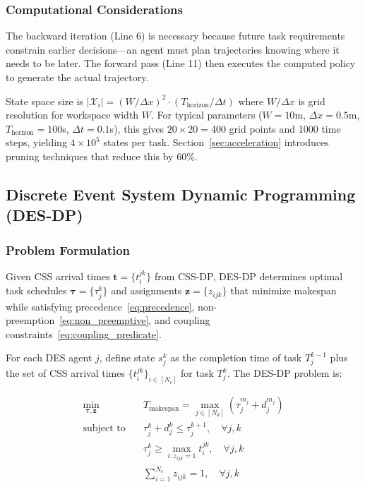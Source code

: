 \documentclass[manuscript,screen,review]{acmart}
\begin{document}
\subsubsection{Computational Considerations}

The backward iteration (Line 6) is necessary because future task requirements
constrain earlier decisions—an agent must plan trajectories knowing where it
needs to be later. The forward pass (Line 11) then executes the computed
policy to generate the actual trajectory.

State space size is $|\mathcal{X}_i| = (W/\Delta x)^2 \cdot (T_{\text{horizon}}/\Delta t)$ where
$W/\Delta x$ is grid resolution for workspace width $W$. For typical parameters
($W=10$m, $\Delta x=0.5$m, $T_{\text{horizon}}=100$s, $\Delta t=0.1$s), this
gives $20 \times 20 = 400$ grid points and 1000 time steps, yielding $4 \times 10^5$
states per task. Section~\ref{sec:acceleration} introduces pruning techniques
that reduce this by 60\%.

\subsection{Discrete Event System Dynamic Programming (DES-DP)}

\subsubsection{Problem Formulation}

Given CSS arrival times $\mathbf{t} = \{t_i^{jk}\}$ from CSS-DP, DES-DP 
determines optimal task schedules $\boldsymbol{\tau} = \{\tau_j^k\}$ and 
assignments $\mathbf{z} = \{z_{ijk}\}$ that minimize makespan while satisfying 
precedence~\eqref{eq:precedence}, non-preemption~\eqref{eq:non_preemptive}, 
and coupling constraints~\eqref{eq:coupling_predicate}.

For each DES agent $j$, define state $s_j^k$ as the completion time of task 
$T_j^{k-1}$ plus the set of CSS arrival times $\{t_i^{jk}\}_{i \in [N_c]}$ 
for task $T_j^k$. The DES-DP problem is:

\begin{equation}
\begin{aligned}
\min_{\boldsymbol{\tau}, \mathbf{z}} \quad & T_{\text{makespan}} = \max_{j \in [N_d]} (\tau_j^{m_j} + d_j^{m_j}) \\
\text{subject to} \quad & \tau_j^k + d_j^k \leq \tau_j^{k+1}, \quad \forall j, k \\
& \tau_j^k \geq \max_{i: z_{ijk}=1} t_i^{jk}, \quad \forall j, k \\
& \sum_{i=1}^{N_c} z_{ijk} = 1, \quad \forall j, k
\end{aligned}
\label{eq:des_dp_problem}
\end{equation}
\end{document}
